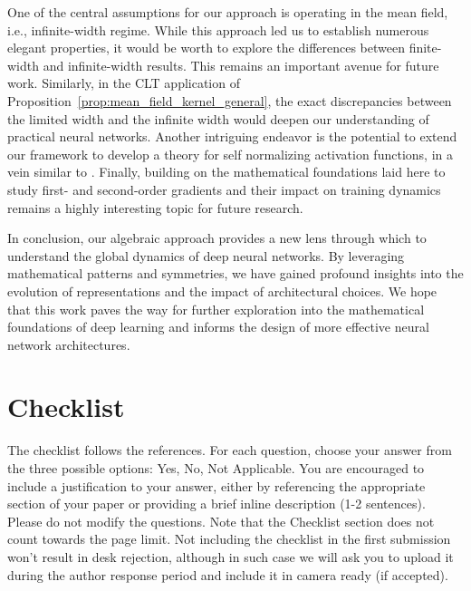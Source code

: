 \documentclass[twoside]{article}
\theoremstyle{definition}
\begin{document}
One of the central assumptions for our approach is operating in the mean field, i.e., infinite-width regime. While this approach led us to establish numerous elegant properties, it would be worth to explore the differences between finite-width and infinite-width results. This remains an important avenue for future work. Similarly, in the CLT application of Proposition~\ref{prop:mean_field_kernel_general}, the exact discrepancies between the limited width and the infinite width would deepen our understanding of practical neural networks.  Another intriguing endeavor is the potential to extend our framework to develop a theory for self normalizing activation functions, in a vein similar to \citet{klambauer2017self}. Finally, building on the mathematical foundations laid here to study first- and second-order gradients and their impact on training dynamics remains a highly interesting topic for future research. 



In conclusion, our algebraic approach provides a new lens through which to understand the global dynamics of deep neural networks. By leveraging mathematical patterns and symmetries, we have gained profound insights into the evolution of representations and the impact of architectural choices. We hope that this work paves the way for further exploration into the mathematical foundations of deep learning and informs the design of more effective neural network architectures.





\onecolumn

\section*{Checklist}


The checklist follows the references. For each question, choose your answer from the three possible options: Yes, No, Not Applicable.  You are encouraged to include a justification to your answer, either by referencing the appropriate section of your paper or providing a brief inline description (1-2 sentences). 
Please do not modify the questions.  Note that the Checklist section does not count towards the page limit. Not including the checklist in the first submission won't result in desk rejection, although in such case we will ask you to upload it during the author response period and include it in camera ready (if accepted).
\end{document}
